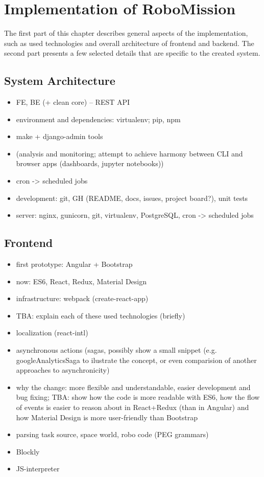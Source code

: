 \chapter{Implementation of RoboMission}
\label{chap:implementation-of-robomission}

The first part of this chapter describes general aspects of the implementation,
such as used technologies and overall architecture of frontend and backend.
The second part presents a few selected details that are specific to the created system.

\section{System Architecture}

\begin{itemize}
\item FE, BE (+ clean core) -- REST API
\item environment and dependencies: virtualenv; pip, npm
\item make + django-admin tools
\item (analysis and monitoring; attempt to achieve harmony between CLI and browser apps (dashboards, jupyter notebooks))
\item cron -> scheduled jobs
\item development: git, GH (README, docs, issues, project board?), unit tests
\item server: nginx, gunicorn, git, virtualenv, PostgreSQL, cron -> scheduled jobs
\end{itemize}

\section{Frontend}

\begin{itemize}
\item first prototype: Angular + Bootstrap
\item now: ES6, React, Redux, Material Design
\item infrastructure: webpack (create-react-app)
\item TBA: explain each of these used technologies (briefly)
\item localization (react-intl)
\item asynchronous actions (sagas, possibly show a small snippet (e.g. googleAnalyticsSaga to ilustrate the concept, or even comparision of another approaches to asynchronicity)
\item why the change: more flexible and understandable, easier development and bug fixing; TBA: show how the code is more readable with ES6, how the flow of events is easier to reason about in React+Redux (than in Angular) and how Material Design is more user-friendly than Bootstrap
\item parsing task source, space world, robo code (PEG grammars)
\item Blockly
\item JS-interpreter
\end{itemize}


